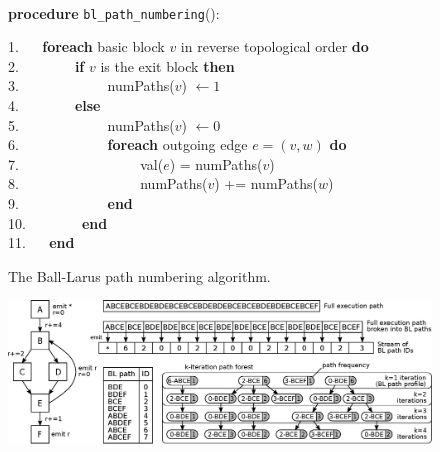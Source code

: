 \else
\begin{figure}[h!]
\caption{\label{alg:kblpp-bl-numbering} The Ball-Larus path numbering algorithm.}
\begin{small}
\begin{minipage}{0.9\textwidth}
\hrulefill\\
\textbf{procedure} {\tt bl\_path\_numbering}(): \\
\vspace{-2mm}

1. ~~ \textbf{foreach} basic block $v$ in reverse topological order \textbf{do}\\
2. ~~ ~~~~ \textbf{if} $v$ is the exit block \textbf{then}\\
3. ~~ ~~~~ ~~~~ numPaths($v$) $\gets 1$\\
4. ~~ ~~~~ \textbf{else}\\
5. ~~ ~~~~ ~~~~ numPaths($v$) $\gets 0$\\
6. ~~ ~~~~ ~~~~ \textbf{foreach} outgoing edge $e = (v, w)$ \textbf{do}\\
7. ~~ ~~~~ ~~~~ ~~~~ val($e$) = numPaths($v$)\\
8. ~~ ~~~~ ~~~~ ~~~~ numPaths($v$) += numPaths($w$)\\
9. ~~ ~~~~ ~~~~ \textbf{end}\\
10. ~~ ~~~~ \textbf{end}\\
11. ~~ \textbf{end}\\
\vspace{-1mm}
\hrulefill
\vspace{-2mm}
\end{minipage}
\end{small}
\end{figure}

\fi

\ifdefined\noauthorea
\begin{figure}[ht]
\begin{center}
\includegraphics[width=\textwidth]{figures/kblpp-example/kblpp-example.eps}
\caption{\protect}
\end{center}
\end{figure}
\fi

